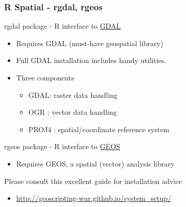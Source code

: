 \documentclass[11pt]{beamer}
\begin{document}
\begin{frame}
\frametitle{R Spatial - rgdal, rgeos}
rgdal package - R interface to \href{http://www.gdal.org/}{GDAL}
\begin{itemize}
\item Requires GDAL (must-have geospatial library)
\item Full GDAL installation includes handy utilities.
\item Three components
\begin{itemize}
\item GDAL: raster data handling
\item OGR : vector data handling
\item PROJ4 : spatial/coordinate reference system
\end{itemize}
\end{itemize}
\bigskip
rgeos package - R interface to \href{https://trac.osgeo.org/geos/}{GEOS}
\begin{itemize}
\item Requires GEOS, a spatial (vector) analysis library
\end{itemize}
\bigskip
Please consult this excellent guide for installation advice
\begin{itemize}
\item \href{http://geoscripting-wur.github.io/system\_setup/}{http://geoscripting-wur.github.io/system\_setup/}
\end{itemize}
\end{frame}
\end{document}
